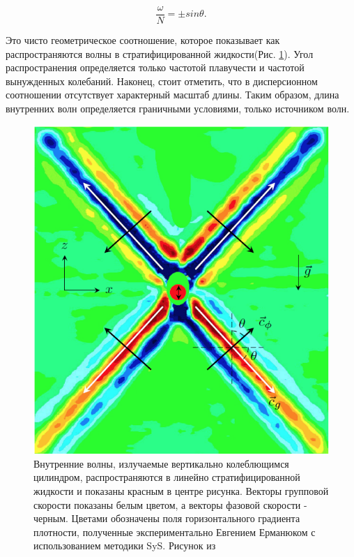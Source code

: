 \begin{equation}
    \frac{\omega}{N} = \pm sin \theta.
    \label{eq:dispersion}
\end{equation}

Это чисто геометрическое соотношение, которое показывает как распространяются волны в стратифицированной жидкости(Рис. \ref{fig:ermExp}). Угол распространения определяется только частотой плавучести и частотой вынужденных колебаний. Наконец, стоит отметить, что в дисперсионном соотношении отсутствует характерный масштаб длины. Таким образом, длина внутренних волн определяется граничными условиями, только источником волн.

\begin{figure}
    \centering
    \includegraphics[scale=0.5]{Figs/Experement_Erm.png}
    \caption{Внутренние волны, излучаемые вертикально колеблющимся цилиндром, распространяются в линейно стратифицированной жидкости и  показаны красным в центре рисунка. Векторы групповой скорости показаны белым цветом, а векторы фазовой скорости - черным. Цветами обозначены поля горизонтального градиента плотности, полученные экспериментально Евгением Ерманюком с использованием методики SyS. Рисунок из \cite{brouzet:tel-01361201}}
    \label{fig:ermExp}
\end{figure}

